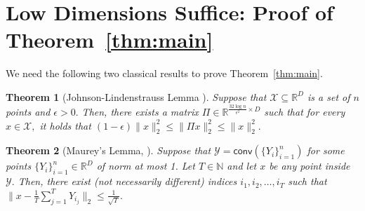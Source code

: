 \documentclass[preprint]{article}
\newtheorem{theorem}{Theorem}[section]
\newcommand{\nbyp}[1]{{\color{red}\textsf{[YP: #1]}}}
\newcommand{\conv}{\mathsf{conv}}
\def\nbyp#1{{\color{red}\textbf{YP:}#1]}}
\begin{document}
\section{Low Dimensions Suffice: Proof of 
\texorpdfstring{Theorem~\ref{thm:main}}{Main Theorem}}
\label{sec:mainthmproof}
We need the following two classical results to prove Theorem~\ref{thm:main}.
\begin{theorem}[Johnson-Lindenstrauss Lemma \cite{johnson1984extensions}]
\label{thm:JL}
Suppose that $\mathcal{X}\subseteq \mathbb{R}^D$ is a set of $n$ points and $\epsilon>0.$ Then, there exists a matrix $\Pi\in \mathbb{R}^{ \frac{32\log n}{\epsilon^2}\times D}$ such that for every $x\in \mathcal{X},$ it holds that 
$(1-\epsilon)\|x\|^2_2\le \|\Pi x\|^2_2\le \|x\|^2_2.$
\end{theorem}
\begin{theorem}[Maurey's Lemma, \cite{pisier1981remarques}]
\label{thm:Murrayslemma}
Suppose that $\mathcal{Y} = \conv(\{Y_i\}_{i = 1}^n)$ for some points $\{Y_i\}_{i = 1}^n\in \mathbb{R}^D$ of norm at most 1. Let $T\in \mathbb{N}$ and let $x$ be any point inside $\mathcal{Y}.$ Then, there exist (not necessarily different) indices $i_1, i_2, \ldots, i_T$ such that 
$
\|x - \frac{1}{T}\sum_{j = 1}^T Y_{i_j}\|_2\le \frac{1}{\sqrt{T}}.
$
\end{theorem}
\end{document}
